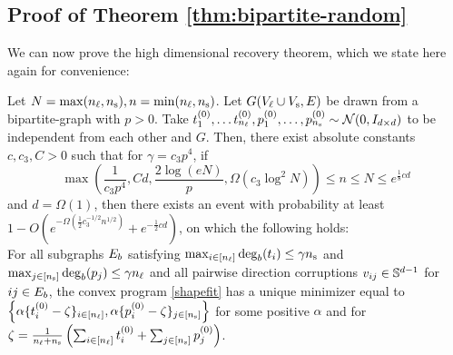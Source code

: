 \subsection{Proof of Theorem \ref{thm:bipartite-random}} \label{sec-proof-random-theorem}
We can now prove the high dimensional recovery theorem, which we state here again for convenience: %
\addtocounter{theorem}{-2}
\begin{theorem} 
Let $N = \max(n_\ell,n_\text{s}), n = \min(n_\ell, n_\text{s})$. Let $G(V_\ell \cup V_\text{s},E)$ be drawn from a bipartite-\erdosrenyi graph with $p >0$. Take $ t^{(0)}_1, \ldots t^{(0)}_{n_\ell}, p^{(0)}_1, \ldots, p^{(0)}_{n_\text{s}} \sim \mathcal{N}(0, I_{d \times d})$ to be independent from each other and $G$. Then, there exist absolute constants $c,c_3, C>0$ such that for $\gamma = c_3 p^4$, if \\
$$\max\left(\frac{1}{c_3 p^4}, Cd, \frac{2 \log(eN)}{p}, \Omega(c_3 \log^2 N)\right) \leq  n \le N \leq e^{\frac{1}{8}c d }$$ 
and $d = \Omega(1)$, then there exists an event with probability at least  $1 - O( e^{-\Omega(\frac{1}{2}c_3^{-1/2} n^{1/2})} + e^{-\frac{1}{2} cd})$, on which the following holds:\\[1em]
For all subgraphs $E_b$ satisfying $\max_{i\in [n_\ell]} \deg_b(t_{i}) \leq \gamma n_\text{s}$ and $\max_{j \in [n_\text{s}]} \deg_b(p_j) \leq \gamma n_\ell$ and all pairwise direction corruptions  $v_{ij} \in \mathbb{S}^{d-1}$ for $ij \in E_b$,  the convex program \eqref{shapefit} has a unique minimizer equal to $\left\{\alpha \{t^{(0)}_{i} -\zeta \}_{i \in [n_\ell]}, \alpha \{p^{(0)}_{i} -\zeta\}_{j \in [n_\text{s}]}  \right\}$ for some positive $\alpha$ and for $\zeta = \frac{1}{n_\ell + n_\text{s}} \left(\sum_{i \in [n_\ell]} t^{(0)}_{i} + \sum_{j \in [n_\text{s}]} p^{{(0)}}_{j} \right)$. 
\end{theorem}
